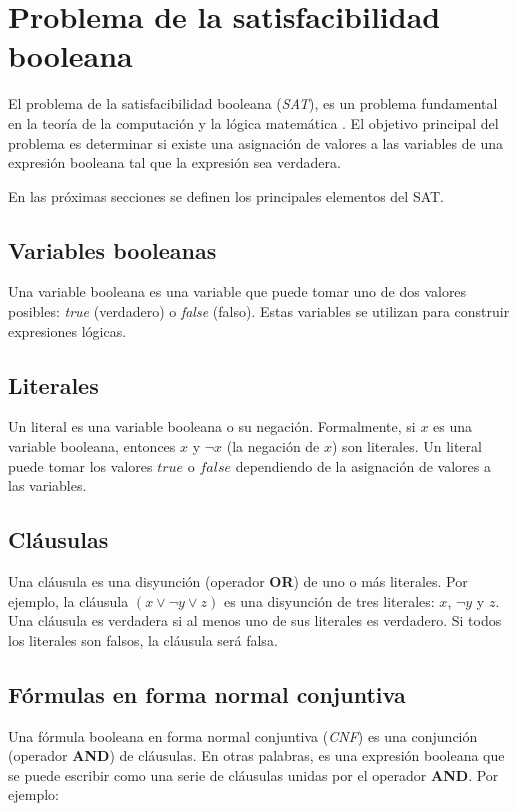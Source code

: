 \documentclass[12pt]{article}
\begin{document}
\section{Problema de la satisfacibilidad booleana}

El problema de la satisfacibilidad booleana (\textit{SAT}), es un problema fundamental en la teoría de la 
computación y la lógica matemática \cite{authomataTheory}. El objetivo principal del problema es determinar si existe una asignación de valores a las variables de una expresión booleana tal que la expresión sea verdadera.

En las próximas secciones se definen los principales elementos del SAT.
\subsection{Variables booleanas}

Una variable booleana es una variable que puede tomar uno de dos valores posibles: \textit{true} (verdadero) o \textit{false} (falso). Estas variables se utilizan para construir expresiones lógicas.

\subsection{Literales}

Un literal es una variable booleana o su negación. Formalmente, si \( x \) es una variable booleana, entonces \( x \) y \( \neg x \) (la negación de \( x \)) son literales. Un literal puede tomar los valores \( true \) o \( false \) dependiendo de la asignación de valores a las variables.

\subsection{Cláusulas}

Una cláusula es una disyunción (operador \textbf{OR}) de uno o más literales. Por ejemplo, la cláusula \( (x \vee \neg y \vee z) \) es una disyunción de tres literales: \( x \), \( \neg y \) y \( z \). Una cláusula es verdadera si al menos uno de sus literales es verdadero. Si todos los literales son falsos, la cláusula será falsa.

\subsection{Fórmulas en forma normal conjuntiva}

Una fórmula booleana en forma normal conjuntiva (\textit{CNF}) es una conjunción (operador \textbf{AND}) de cláusulas. En otras palabras, es una expresión booleana que se puede escribir como una serie de cláusulas unidas por el operador \textbf{AND}. Por ejemplo:
\end{document}
